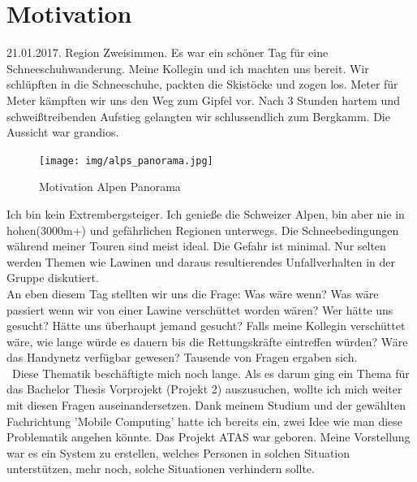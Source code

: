 \documentclass[11pt,english,german]{report}
\theoremstyle{definition}
\begin{document}
\chapter*{Motivation}
21.01.2017. Region Zweisimmen. Es war ein schöner Tag für eine Schneeschuhwanderung. Meine Kollegin und ich machten uns bereit. Wir schlüpften in die Schneeschuhe, packten die Skistöcke und zogen los. Meter für Meter kämpften wir uns den Weg zum Gipfel vor. Nach 3 Stunden hartem und schweißtreibenden Aufstieg gelangten wir schlussendlich zum Bergkamm. Die Aussicht war grandios.
\begin{figure}[H]
	\centering
	\texttt{[image: img/alps\_panorama.jpg]}
	\caption[Motvation Alpen Panorama]
	{Motivation Alpen Panorama}
\end{figure}
\noindent
Ich bin kein Extrembergsteiger. Ich genieße die Schweizer Alpen, bin aber nie in hohen(3000m+) und gefährlichen Regionen unterwegs. Die Schneebedingungen während meiner Touren sind meist ideal. Die Gefahr ist minimal. Nur selten werden Themen wie Lawinen und daraus resultierendes Unfallverhalten in der Gruppe diskutiert.\\[0.3cm]
An eben diesem Tag stellten wir uns die Frage: Was wäre wenn? Was wäre passiert wenn wir von einer Lawine verschüttet worden wären? Wer hätte uns gesucht? Hätte uns überhaupt jemand gesucht? Falls meine Kollegin verschüttet wäre, wie lange würde es dauern bis die Rettungskräfte eintreffen würden? Wäre das Handynetz verfügbar gewesen? Tausende von Fragen ergaben sich.\\[0.3cm]\
Diese Thematik beschäftigte mich noch lange. Als es darum ging ein Thema für das Bachelor Thesis Vorprojekt (Projekt 2) auszusuchen, wollte ich mich weiter mit diesen Fragen auseinandersetzen. Dank meinem Studium und der gewählten Fachrichtung 'Mobile Computing' hatte ich bereits ein, zwei Idee wie man diese Problematik angehen könnte. Das Projekt ATAS war geboren. Meine Vorstellung war es ein System zu erstellen, welches Personen in solchen Situation unterstützen, mehr noch, solche Situationen verhindern sollte.\\[0.3cm]
\end{document}
